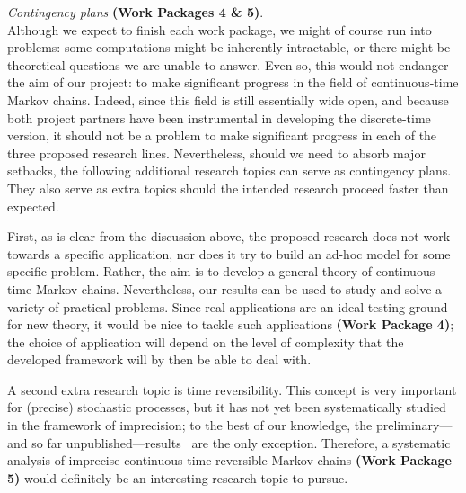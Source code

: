 \documentclass[11pt,dvipsnames,usenames,a4paper]{article}
\begin{document}
\emph{Contingency plans} {\bf (Work Packages 4 \& 5)}.\\[3pt]
Although we expect to finish each work package, we might of course run into problems: some computations might be inherently intractable, or there might be theoretical questions we are unable to answer.
Even so, this would not endanger the aim of our project: to make significant progress in the field of continuous-time Markov chains.
Indeed, since this field is still essentially wide open, and because both project partners have been instrumental in developing the discrete-time version, it should not be a problem to make significant progress in each of the three proposed research lines.
Nevertheless, should we need to absorb major setbacks, the following additional research topics can serve as contingency plans.
They also serve as extra topics should the intended research proceed faster than expected.

First, as is clear from the discussion above, the proposed research does not work towards a specific application, nor does it try to build an ad-hoc model for some specific problem.
Rather, the aim is to develop a general theory of continuous-time Markov chains.
Nevertheless, our results can be used to study and solve a variety of practical problems.
Since real applications are an ideal testing ground for new theory, it would be nice to tackle such applications {\bf (Work Package 4)}; the choice of application will depend on the level of complexity that the developed framework will by then be able to deal with.

A second extra research topic is time reversibility.
This concept is very important for (precise) stochastic processes, but it has not yet been systematically studied in the framework of imprecision; to the best of our knowledge, the preliminary---and so far unpublished---results~\cite{skulj:16} are the only exception.
Therefore, a systematic analysis of imprecise continuous-time reversible Markov chains {\bf (Work Package 5)} would definitely be an interesting research topic to pursue.
\end{document}
